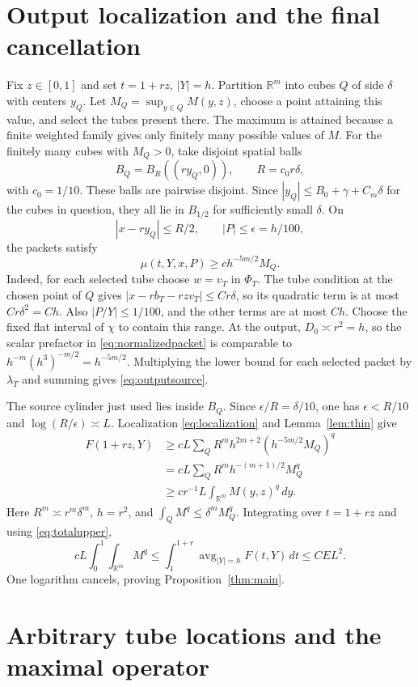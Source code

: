 \documentclass[11pt]{article}
\numberwithin{equation}{section}
\newcommand{\R}{\mathbb R}
\newcommand{\dd}{\,d}
\begin{document}
\section{Output localization and the final cancellation}

Fix $z\in[0,1]$ and set $t=1+rz$, $|Y|=h$.
Partition $\R^m$ into cubes $Q$ of side $\delta$ with centers $y_Q$.
Let $M_Q=\sup_{y\in Q}M(y,z)$, choose a point attaining this
value, and select the tubes present there. The maximum is attained
because a finite weighted family gives only finitely many possible
values of $M$. For the finitely many cubes with $M_Q>0$, take
disjoint spatial balls
\[
 B_Q=B_R((r y_Q,0)),\qquad R=c_0r\delta,
\]
with $c_0=1/10$. These balls are pairwise disjoint.
Since $|y_Q|\le B_0+\gamma+C_m\delta$ for the cubes in question,
they all lie in $B_{1/2}$ for sufficiently small $\delta$. On
\[
 |x-r y_Q|\le R/2,\qquad |P|\le\epsilon=h/100,
\]
the packets satisfy
\begin{equation}\label{eq:outputsource}
 \mu(t,Y,x,P)\ge c h^{-5m/2}M_Q.
\end{equation}
Indeed, for each selected tube choose $w=v_T$ in $\Phi_T$. The tube condition at the chosen
point of $Q$ gives $|x-rb_T-rzv_T|\le Cr\delta$, so its quadratic
term is at most $Cr\delta^2=Ch$. Also $|P/Y|\le1/100$,
and the other terms are at most $Ch$. Choose the fixed flat interval
of $\chi$ to contain this range. At the output,
$D_0\asymp r^2=h$, so the scalar prefactor in
\eqref{eq:normalizedpacket} is comparable to
$h^{-m}(h^3)^{-m/2}=h^{-5m/2}$.
Multiplying the lower bound for each selected packet by $\lambda_T$
and summing gives \eqref{eq:outputsource}.

The source cylinder just used lies inside $B_Q$.
Since $\epsilon/R=\delta/10$, one has
$\epsilon<R/10$ and $\log(R/\epsilon)\asymp L$. Localization
\eqref{eq:localization} and Lemma~\ref{lem:thin} give
\begin{align*}
 F(1+rz,Y)
 &\ge c L\sum_Q R^m h^{2m+2}(h^{-5m/2}M_Q)^q\\
 &=c L\sum_Q R^m h^{-(m+1)/2}M_Q^q\\
 &\ge c r^{-1}L\int_{\R^m}M(y,z)^q\dd y.
\end{align*}
Here $R^m\asymp r^m\delta^m$, $h=r^2$, and
$\int_QM^q\le\delta^mM_Q^q$.
Integrating over $t=1+rz$ and using \eqref{eq:totalupper},
\[
 c L\int_0^1\int_{\R^m}M^q
 \le\int_1^{1+r}\operatorname{avg}_{|Y|=h}F(t,Y)\dd t
 \le C E L^2.
\]
One logarithm cancels, proving Proposition~\ref{thm:main}.

\section{Arbitrary tube locations and the maximal operator}
\end{document}
